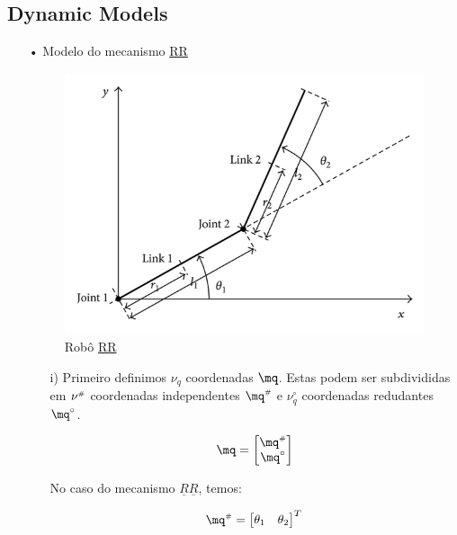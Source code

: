 \subsection{Dynamic Models}\label{S02-2}

\begin{itemize}
\item[•] Modelo do mecanismo \underline{R}\underline{R}

\begin{figure}[h!]
	\centering
	\includegraphics[scale=1.5]{RR.jpg}  
	\caption{Rob\^o \underline{R}\underline{R}}
	\label{fig:figura2}
\end{figure}

	\begin{itemize}
	\item[i)] Primeiro definimos $\nu_q$ coordenadas  $\mq$. Estas podem ser subdivididas em $\nu^{\scriptscriptstyle \#}$ coordenadas independentes $\mq\ssh$ e $\nu_q^\circ$ 	coordenadas redudantes $\mq^\circ$.
	
	$$
	\mq = \begin{bmatrix}
	\mq\ssh \\
	\mq^\circ
	\end{bmatrix}
	$$

	No caso do mecanismo $\underline{R}\underline{R}$, temos:

	\begin{equation}
	\mq\ssh = \begin{bmatrix}
	\theta_1 & \theta_2
	\end{bmatrix}^T \\
	\end{equation}
	

\end{itemize}
\end{itemize}
